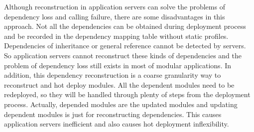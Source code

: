 \documentclass[conference]{IEEEtran}
\begin{document}
Although reconstruction in application servers can solve the problems of dependency loss and calling failure, there are some disadvantages in this approach.
Not all the dependencies can be obtained during deployment process and be recorded in the dependency mapping table without static profiles.
Dependencies of inheritance or general reference cannot be detected by servers.
So application servers cannot reconstruct these kinds of dependencies and the problem of dependency loss still exists in most of modular applications.
In addition, this dependency reconstruction is a coarse granularity way to reconstruct and hot deploy modules.
All the dependent modules need to be redeployed, so they will be handled through plenty of steps from the deployment process.
Actually, depended modules are the updated modules and updating dependent modules is just for reconstructing dependencies.
This causes application servers inefficient and also causes hot deployment inflexibility.




\end{document}
